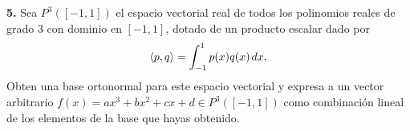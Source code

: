 \documentclass[a4paper]{article}
\begin{document}
\vspace{1cm}
\textbf{5.} Sea $P^3([-1,1])$ el espacio vectorial real de todos los polinomios reales de grado $3$ con dominio en $[-1,1]$, dotado de un producto escalar dado por $$\langle p,q\rangle = \int_{-1}^1 p(x)q(x)\hspace{0.5mm} dx.$$ \noindent Obten una base ortonormal para este espacio vectorial y expresa a un vector arbitrario $f(x)=ax^3+bx^2+cx+d\in P^3([-1,1])$ como combinación lineal de los elementos de la base que hayas obtenido.
\end{document}
